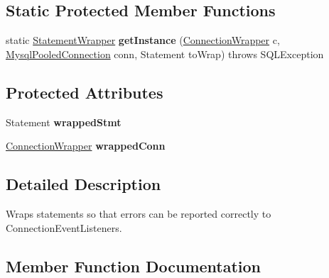 \subsection*{Static Protected Member Functions}
\begin{DoxyCompactItemize}
\item 
\mbox{\label{classcom_1_1mysql_1_1jdbc_1_1jdbc2_1_1optional_1_1_statement_wrapper_aca9672884713ddc65aca7cc47a5b7bbf}} 
static \mbox{\hyperlink{classcom_1_1mysql_1_1jdbc_1_1jdbc2_1_1optional_1_1_statement_wrapper}{Statement\+Wrapper}} {\bfseries get\+Instance} (\mbox{\hyperlink{classcom_1_1mysql_1_1jdbc_1_1jdbc2_1_1optional_1_1_connection_wrapper}{Connection\+Wrapper}} c, \mbox{\hyperlink{classcom_1_1mysql_1_1jdbc_1_1jdbc2_1_1optional_1_1_mysql_pooled_connection}{Mysql\+Pooled\+Connection}} conn, Statement to\+Wrap)  throws S\+Q\+L\+Exception 
\end{DoxyCompactItemize}
\subsection*{Protected Attributes}
\begin{DoxyCompactItemize}
\item 
\mbox{\label{classcom_1_1mysql_1_1jdbc_1_1jdbc2_1_1optional_1_1_statement_wrapper_a4d28b04256fb91decf1945f93fcd19b3}} 
Statement {\bfseries wrapped\+Stmt}
\item 
\mbox{\label{classcom_1_1mysql_1_1jdbc_1_1jdbc2_1_1optional_1_1_statement_wrapper_add31a1f1256ecd0bd486e3b57769a026}} 
\mbox{\hyperlink{classcom_1_1mysql_1_1jdbc_1_1jdbc2_1_1optional_1_1_connection_wrapper}{Connection\+Wrapper}} {\bfseries wrapped\+Conn}
\end{DoxyCompactItemize}


\subsection{Detailed Description}
Wraps statements so that errors can be reported correctly to Connection\+Event\+Listeners. 

\subsection{Member Function Documentation}
\mbox{\label{classcom_1_1mysql_1_1jdbc_1_1jdbc2_1_1optional_1_1_statement_wrapper_ac0104dd3c2bc950cc6305c706dd6d755}} 
